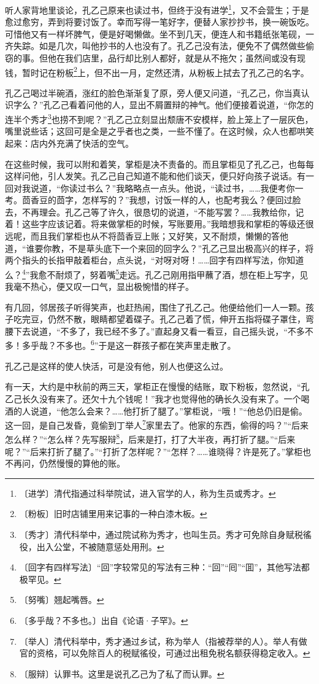 \documentclass[12pt,UTF-8,openany]{ctexbook}
\begin{document}
\begin{large}
    听人家背地里谈论，孔乙己原来也读过书，但终于没有进学\footnote{〔进学〕清代指通过科举院试，进入官学的人，称为生员或秀才。}，又不会营生；于是愈过愈穷，弄到将要讨饭了。幸而写得一笔好字，便替人家抄抄书，换一碗饭吃。可惜他又有一样坏脾气，便是好喝懒做。坐不到几天，便连人和书籍纸张笔砚，一齐失踪。如是几次，叫他抄书的人也没有了。孔乙己没有法，便免不了偶然做些偷窃的事。但他在我们店里，品行却比别人都好，就是从不拖欠；虽然间或没有现钱，暂时记在粉板\footnote{〔粉板〕旧时店铺里用来记事的一种白漆木板。}上，但不出一月，定然还清，从粉板上拭去了孔乙己的名字。
    
    孔乙己喝过半碗酒，涨红的脸色渐渐复了原，旁人便又问道，“孔乙己，你当真认识字么？”孔乙己看着问他的人，显出不屑置辩的神气。他们便接着说道，“你怎的连半个秀才\footnote{〔秀才〕清代科举中，通过院试称为秀才，也叫生员。秀才可免除自身赋税徭役，出入公堂，不被随意惩处用刑。}也捞不到呢？”孔乙己立刻显出颓唐不安模样，脸上笼上了一层灰色，嘴里说些话；这回可是全是之乎者也之类，一些不懂了。在这时候，众人也都哄笑起来：店内外充满了快活的空气。
    
    在这些时候，我可以附和着笑，掌柜是决不责备的。而且掌柜见了孔乙己，也每每这样问他，引人发笑。孔乙己自己知道不能和他们谈天，便只好向孩子说话。有一回对我说道，“你读过书么？”我略略点一点头。他说，“读过书，……我便考你一考。茴香豆的茴字，怎样写的？”我想，讨饭一样的人，也配考我么？便回过脸去，不再理会。孔乙己等了许久，很恳切的说道，“不能写罢？……我教给你，记着！这些字应该记着。将来做掌柜的时候，写账要用。”我暗想我和掌柜的等级还很远呢，而且我们掌柜也从不将茴香豆上账；又好笑，又不耐烦，懒懒的答他道，“谁要你教，不是草头底下一个来回的回字么？”孔乙己显出极高兴的样子，将两个指头的长指甲敲着柜台，点头说，“对呀对呀！……回字有四样写法，你知道么？\footnote{〔回字有四样写法〕“回”字较常见的写法有三种：“回”“囘”“囬”，其他写法都极罕见。}”我愈不耐烦了，努着嘴\footnote{〔努嘴〕翘起嘴唇。}走远。孔乙己刚用指甲蘸了酒，想在柜上写字，见我毫不热心，便又叹一口气，显出极惋惜的样子。
    
    有几回，邻居孩子听得笑声，也赶热闹，围住了孔乙己。他便给他们一人一颗。孩子吃完豆，仍然不散，眼睛都望着碟子。孔乙己着了慌，伸开五指将碟子罩住，弯腰下去说道，“不多了，我已经不多了。”直起身又看一看豆，自己摇头说，“不多不多！多乎哉？不多也。\footnote{〔多乎哉？不多也。〕出自《论语·子罕》。}”于是这一群孩子都在笑声里走散了。
    
    孔乙己是这样的使人快活，可是没有他，别人也便这么过。
    
    有一天，大约是中秋前的两三天，掌柜正在慢慢的结账，取下粉板，忽然说，“孔乙己长久没有来了。还欠十九个钱呢！”我才也觉得他的确长久没有来了。一个喝酒的人说道，“他怎么会来？……他打折了腿了。”掌柜说，“哦！”“他总仍旧是偷。这一回，是自己发昏，竟偷到丁举人\footnote{〔举人〕清代科举中，秀才通过乡试，称为举人（指被荐举的人）。举人有做官的资格，可以免除百人的税赋徭役，可通过出租免税名额获得稳定收入。}家里去了。他家的东西，偷得的吗？”“后来怎么样？”“怎么样？先写服辩\footnote{〔服辩〕认罪书。这里是说孔乙己为了私了而认罪。}，后来是打，打了大半夜，再打折了腿。”“后来呢？”“后来打折了腿了。”“打折了怎样呢？”“怎样？……谁晓得？许是死了。”掌柜也不再问，仍然慢慢的算他的账。
    

\end{large}
\end{document}
